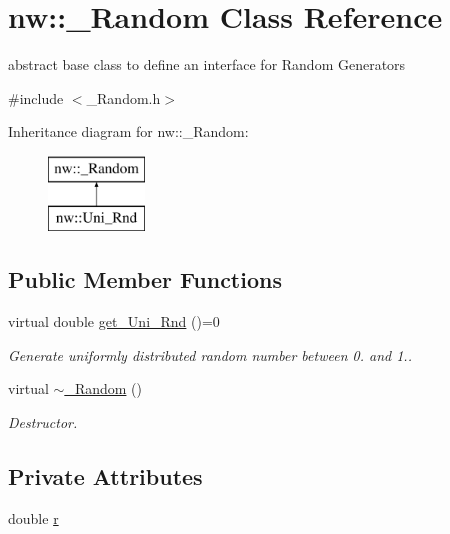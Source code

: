 \hypertarget{classnw_1_1___random}{\section{nw\+:\+:\+\_\+\+Random Class Reference}
\label{classnw_1_1___random}
}


abstract base class to define an interface for Random Generators  




{\ttfamily \#include $<$\+\_\+\+Random.\+h$>$}

Inheritance diagram for nw\+:\+:\+\_\+\+Random\+:\begin{figure}[H]
\begin{center}
\leavevmode
\includegraphics[height=2.000000cm]{db/da1/classnw_1_1___random}
\end{center}
\end{figure}
\subsection*{Public Member Functions}
\begin{DoxyCompactItemize}
\item 
virtual double \hyperlink{classnw_1_1___random_a943da227bd614e34718967a0521a51d1}{get\+\_\+\+Uni\+\_\+\+Rnd} ()=0
\begin{DoxyCompactList}\small\item\em Generate uniformly distributed random number between 0. and 1.. \end{DoxyCompactList}\item 
virtual \hyperlink{classnw_1_1___random_a68b23d50878448edbeb2f9b61d9d36cd}{$\sim$\+\_\+\+Random} ()
\begin{DoxyCompactList}\small\item\em Destructor. \end{DoxyCompactList}\end{DoxyCompactItemize}
\subsection*{Private Attributes}
\begin{DoxyCompactItemize}
\item 
double \hyperlink{classnw_1_1___random_acfb88075bfcae45bbbd989568cef5250}{r}
\end{DoxyCompactItemize}


